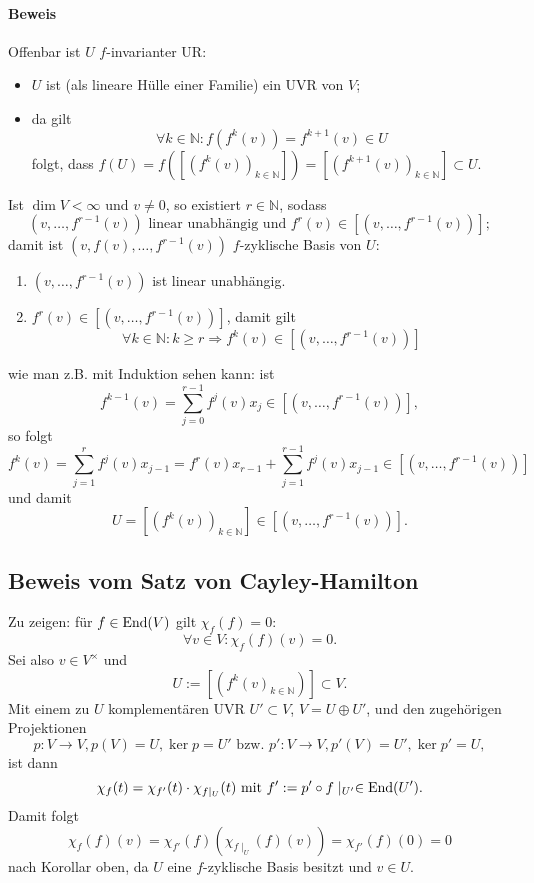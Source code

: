 \paragraph{Beweis}
	Offenbar ist $ U $ $ f $-invarianter UR:
	\begin{itemize}
		\item $ U $ ist (als lineare Hülle einer Familie) ein UVR von $ V $;
		\item da gilt
			\[ \forall k\in \mathbb{N}: f\left(f^k(v)\right)=f^{k+1}(v)\in U \]
			folgt, dass $ f(U) = f\left(\left[\left(f^k(v)\right)_{k\in{\mathbb{N}}}\right]\right) = \left[\left(f^{k+1}(v)\right)_{k\in{\mathbb{N}}}\right]\subset U. $
	\end{itemize}
	Ist $ \dim V < \infty $ und $ v\neq 0 $, so existiert $ r\in \mathbb{N} $, sodass
		\[ \left(v,\dots,f^{r-1}(v)\right) \text{ linear unabhängig und }f^r(v)\in\left[\left(v,\dots,f^{r-1}(v)\right)\right]; \]
	damit ist $ \left(v,f(v),\dots, f^{r-1}(v)\right) $ $ f $-zyklische Basis von $ U $:
	\begin{enumerate}
		\item $ \left(v,\dots,f^{r-1}(v) \right) $ ist linear unabhängig.
		\item $ f^r(v) \in \left[\left(v,\dots,f^{r-1}(v)\right)\right]$, damit gilt
		\[ \forall k\in \mathbb{N}: k\geq r \Rightarrow f^k(v)\in \left[\left(v,\dots,f^{r-1}(v)\right)\right] \]
	\end{enumerate}
	wie man z.B. mit Induktion sehen kann: ist
		\[ f^{k-1}(v) = \sum_{j=0}^{r-1}f^j(v)x_j \in \left[\left(v,\dots,f^{r-1}(v)\right) \right], \]
	so folgt
		\[ f^k(v) = \sum_{j=1}^{r}f^j(v)x_{j-1}=f^{r}(v)x_{r-1}+\sum_{j=1}^{r-1}f^j(v)x_{j-1}\in \left[\left(v,\dots,f^{r-1}(v)\right)\right] \]
	und damit
		\[ U = \left[\left(f^k(v)\right)_{k\in \mathbb{N}}\right]\in \left[\left(v,\dots,f^{r-1}(v)\right)\right]. \]
\subsection{Beweis vom Satz von Cayley-Hamilton}
	Zu zeigen: für $ f\in \operatorname{End}(V) $ gilt $ \chi_f(f)=0 $:
		\[ \forall v\in V:\chi_f(f)(v) = 0. \]
	Sei also $ v\in V^\times $ und
		\[ U := \left[\left( f^k(v)_{k\in \mathbb{N}}\right)\right]\subset V. \]
	Mit einem zu $ U $ komplementären UVR $ U'\subset V $, $ V=U\oplus U' $, und den zugehörigen Projektionen
		\[ p: V\to V, p(V) = U,\ker p = U' \text{ bzw. }p':V\to V, p'(V)=U', \ker p' = U, \]
	ist dann
		\[ \chi_f(t) = \chi_{f'}(t)\cdot \chi_{f\mid_U}(t) \text{ mit } f' := p'\circ f\mid_{U'}\in \operatorname{End}(U'). \]
	Damit folgt
		\[ \chi_f(f)(v) = \chi_{f'}(f) \left(\chi_{f\mid_U}(f)(v) \right) = \chi_{f'}(f)(0)=0 \]
	nach Korollar oben, da $ U $ eine $ f $-zyklische Basis besitzt und $ v\in U $.